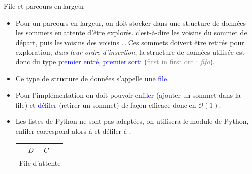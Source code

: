 \documentclass[10pt,french]{beamer}
\begin{document}
\begin{frame}[fragile]{\Ctitle}{\stitle}
	\begin{block}{File et parcours en largeur}
		\begin{itemize}
			\item<1-> Pour un parcours en largeur, on doit stocker dans une structure de données les sommets en attente d'être explorés. c'est-à-dire les voisins du sommet de départ, puis les voisins des voisins \dots 
			Ces sommets doivent être retirés pour exploration, \textit{dans leur ordre d'insertion}, la structure de données utilisée est donc du type \textcolor{blue}{premier entré, premier sorti} (\textcolor{gray}{first in first out : \textit{\sc fifo}}).
			\item<2-> Ce type de structure de données s'appelle une \textcolor{blue}{file}.
			\item<3-> Pour l'implémentation on doit pouvoir \textcolor{blue}{enfiler} (ajouter un sommet dans la file) et \textcolor{blue}{défiler} (retirer un sommet) de façon efficace donc en $\mathcal{O}(1)$. 
			\item<4-> Les listes de Python ne sont pas adaptées, on utilisera le module  de Python, enfiler correspond alors à  et défiler à .\vspace{0.4cm} \\
			  \hspace{2cm}
			\begin{tabular}{|p{0.5cm}|p{0.5cm}|p{0.5cm}|p{0.5cm}|}
				\hline
				\rnode{in}{$E$} & {$D$} & {$C$} & \rnode{out}{$B$} \\
				\hline
				\multicolumn{4}{c}{File d'attente} \\
			\end{tabular}
			\hspace{2cm} \onslide<9->{\rnode{def}{\framebox[1cm]{$B$}}}
		\end{itemize}
	\end{block}
\end{frame}
\end{document}
